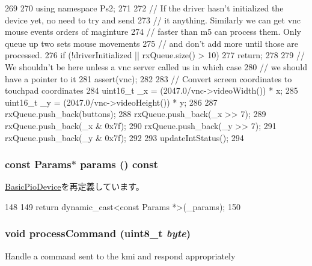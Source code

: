 \begin{DoxyCode}
269 {
270     using namespace Ps2;
271 
272     // If the driver hasn't initialized the device yet, no need to try and send
273     // it anything. Similarly we can get vnc mouse events orders of maginture
274     // faster than m5 can process them. Only queue up two sets mouse movements
275     // and don't add more until those are processed.
276     if (!driverInitialized || rxQueue.size() > 10)
277         return;
278 
279     // We shouldn't be here unless a vnc server called us in which case
280     // we should have a pointer to it
281     assert(vnc);
282 
283     // Convert screen coordinates to touchpad coordinates
284     uint16_t _x = (2047.0/vnc->videoWidth()) * x;
285     uint16_t _y = (2047.0/vnc->videoHeight()) * y;
286 
287     rxQueue.push_back(buttons);
288     rxQueue.push_back(_x >> 7);
289     rxQueue.push_back(_x & 0x7f);
290     rxQueue.push_back(_y >> 7);
291     rxQueue.push_back(_y & 0x7f);
292 
293     updateIntStatus();
294 }
\end{DoxyCode}
\hypertarget{classPl050_acd3c3feb78ae7a8f88fe0f110a718dff}{
\subsubsection[{params}]{\setlength{\rightskip}{0pt plus 5cm}const {\bf Params}$\ast$ params () const}}
\label{classPl050_acd3c3feb78ae7a8f88fe0f110a718dff}


\hyperlink{classBasicPioDevice_acd3c3feb78ae7a8f88fe0f110a718dff}{BasicPioDevice}を再定義しています。


\begin{DoxyCode}
148     {
149         return dynamic_cast<const Params *>(_params);
150     }
\end{DoxyCode}
\hypertarget{classPl050_a71bcba1e6fb2b38cac48b70b7a227c05}{
\subsubsection[{processCommand}]{\setlength{\rightskip}{0pt plus 5cm}void processCommand (uint8\_\-t {\em byte})}}
\label{classPl050_a71bcba1e6fb2b38cac48b70b7a227c05}
Handle a command sent to the kmi and respond appropriately 



